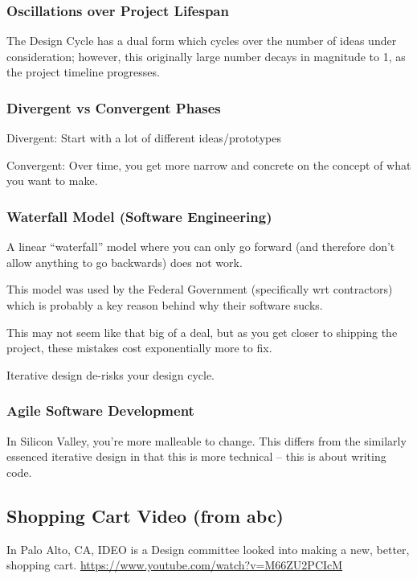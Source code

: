 \subsubsection{Oscillations over Project Lifespan}
The Design Cycle has a dual form which cycles over the number of ideas under consideration; however, this originally large number decays in magnitude to 1, as the project timeline progresses.

\subsubsection{Divergent vs Convergent Phases}
Divergent: Start with a lot of different ideas/prototypes

Convergent: Over time, you get more narrow and concrete on the concept of what you want to make.

\subsubsection{Waterfall Model (Software Engineering)}
A linear ``waterfall'' model where you can only go forward (and therefore don't allow anything to go backwards) does not work.

This model was used by the Federal Government (specifically wrt contractors) which is probably a key reason behind why their software sucks.

\begin{important}
This may not seem like that big of a deal, but as you get closer to shipping the project, these mistakes cost exponentially more to fix.
\end{important}

Iterative design de-risks your design cycle.

\subsubsection{Agile Software Development}
In Silicon Valley, you're more malleable to change. This differs from the similarly essenced iterative design in that this is more technical -- this is about writing code.

\subsection{Shopping Cart Video (from abc)}
In Palo Alto, CA, IDEO is a Design committee looked into making a new, better, shopping cart. \href{https://www.youtube.com/watch?v=M66ZU2PCIcM}{https://www.youtube.com/watch?v=M66ZU2PCIcM}

